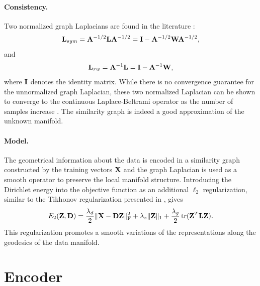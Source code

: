 \paragraph{Consistency.}
Two normalized graph Laplacians are found in the literature \cite{chung1997spectralGraphTheory}:
\begin{equation}
	\mathbf{L}_{sym} = \mathbf{A}^{-1/2} \mathbf{L} \mathbf{A}^{-1/2} = \mathbf{I} - \mathbf{A}^{-1/2} \mathbf{W} \mathbf{A}^{-1/2},
\end{equation}
and
\begin{equation}
	\mathbf{L}_{rw} = \mathbf{A}^{-1} \mathbf{L} = \mathbf{I} - \mathbf{A}^{-1} \mathbf{W},
\end{equation}
where $\mathbf{I}$ denotes the identity matrix.
While there is no convergence guarantee for the unnormalized graph Laplacian, these two normalized Laplacian can be shown to converge to the continuous Laplace-Beltrami operator as the number of samples increase \cite{vonluxburg2008consistency}. The similarity graph is indeed a good approximation of the unknown manifold.

\paragraph{Model.}
The geometrical information about the data is encoded in a similarity graph constructed by the training vectors $\mathbf{X}$ and the graph Laplacian is used as a smooth operator to preserve the local manifold structure. Introducing the Dirichlet energy into the objective function as an additional $\ell_2$ regularization, similar to the Tikhonov regularization presented in , gives
\begin{equation}\label{eqn:en_structure}
	E_2(\mathbf{Z}, \mathbf{D}) = \frac{\lambda_d}{2} \| \mathbf{X} - \mathbf{D} \mathbf{Z} \|_\text{F}^2 + \lambda_z \| \mathbf{Z} \|_1 + \frac{\lambda_g}{2} \operatorname*{tr}(\mathbf{Z}^T \mathbf{L} \mathbf{Z}).
\end{equation}
This regularization promotes a smooth variations of the representations along the geodesics of the data manifold.

\section{Encoder} \label{sec:encoder}

